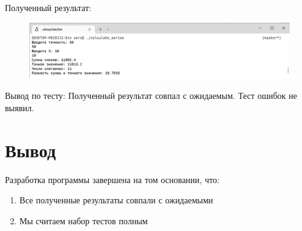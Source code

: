 \documentclass[a4paper]{article}
\begin{document}
\begin{enumerate}[label=\textbf{Тест \arabic*},start=3]
		
		
		Полученный результат:
		
		\begin{figure}[h]
			\includegraphics[width=\textwidth,trim=0.5mm 0 0 0.5mm,clip]{tests/test50.png}
		\end{figure}
		
		Вывод по тесту: Полученный результат совпал с ожидаемым. Тест ошибок не выявил.
	\end{enumerate}
	
	\section{Вывод}
	
	Разработка программы завершена на том основании, что:
	
	\begin{enumerate}
		\item Все полученные результаты совпали с ожидаемыми
		\item Мы считаем набор тестов полным
	\end{enumerate}
\end{document}
